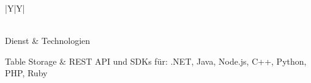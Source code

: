 \begin{xltabular}{\textwidth}{{|Y|Y|}}
\caption{Technologien zum Verwenden der Azure Dienste \label{table:eva_tech}} \\

\hline 
Dienst
& Technologien
\\ \hline
\endfirsthead

Table Storage
&  REST API und SDKs für: .NET, Java, Node.js, C++, Python, PHP, Ruby \cite{reagan_web_2018}
\\ \hline


\end{xltabular}